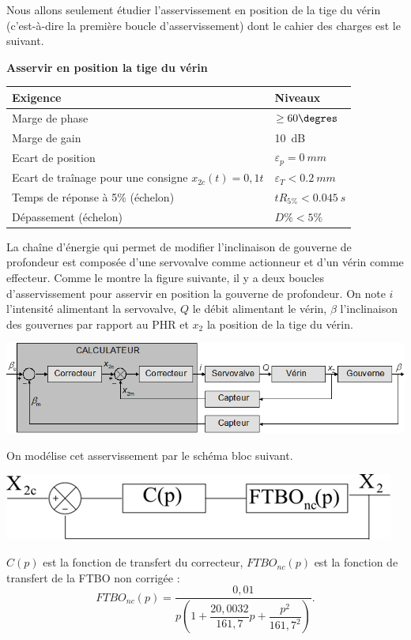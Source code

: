 \documentclass[10pt,fleqn]{article} %
\begin{document}
\begin{multicols}{2}
Nous allons seulement étudier l’asservissement en position de la tige du vérin (c’est-à-dire la première boucle d’asservissement) dont le cahier des charges est le suivant.

\begin{center}
\textbf{Asservir en position la tige du vérin }
\begin{tabular}{|p{.45\linewidth}|p{.45\linewidth}|}
\hline
 Exigence	& Niveaux \\ \hline\hline
 Marge de phase	 & $\geq 60\degres $\\ \hline
 Marge de gain	 & \SI{10}{dB} \\ \hline
 Ecart de position&	$\varepsilon_p=\SI{0}{mm}$\\ \hline
 Ecart de traînage pour une consigne $x_{2c} (t)=0,1 t $ & $\varepsilon_T<\SI{0.2}{mm}$\\ \hline
 Temps de réponse à 5\% (échelon)& $tR_{5\%}< \SI{0.045}{s}$ \\ \hline
 Dépassement (échelon)	& $D\%< 5\%$\\ \hline
\end{tabular}
\end{center}

La chaîne d’énergie qui permet de modifier l’inclinaison de gouverne de profondeur est composée d’une servovalve comme actionneur et d’un vérin comme effecteur. Comme le montre la figure suivante, il y a deux boucles d’asservissement pour asservir en position la gouverne de profondeur. On note $i$ l'intensité alimentant la servovalve, $Q$ le débit alimentant le vérin, $\beta$ l'inclinaison des gouvernes par rapport au PHR et $x_2$ la position de la tige du vérin.
 



\begin{center}
\includegraphics[width=\linewidth]{images/fig_03}
\end{center}


On modélise cet asservissement par le schéma bloc suivant.
\begin{center}
\includegraphics[width=\linewidth]{images/fig_04}
\end{center}
$C(p)$ est la fonction de transfert du correcteur, $FTBO_{nc}(p)$ est la fonction de transfert de la FTBO non corrigée : 
$$
FTBO_{nc}(p)=\dfrac{0,01}{p\left(1+\dfrac{2 0,0032}{161,7}p + \dfrac{p^2}{161,7^2} \right)}.
$$


\end{multicols}
\end{document}
